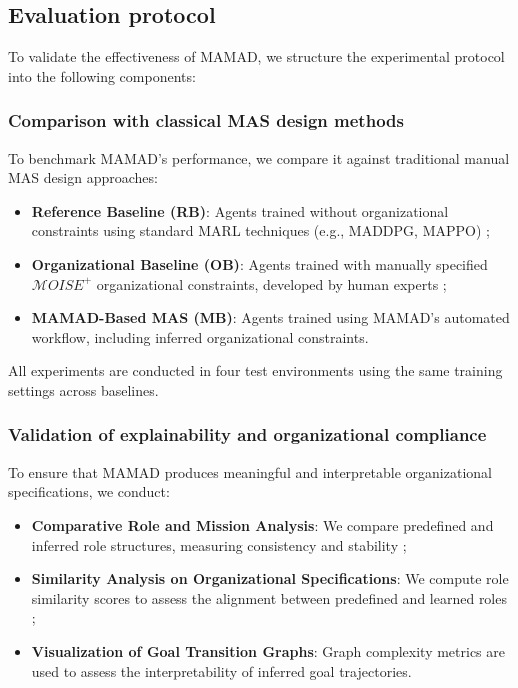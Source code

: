 \documentclass[pdflatex,sn-mathphys-num]{sn-jnl}%
\theoremstyle{thmstyleone}%
\theoremstyle{thmstyletwo}%
\theoremstyle{thmstylethree}%
\begin{document}
\subsection{Evaluation protocol}

To validate the effectiveness of MAMAD, we structure the experimental protocol into the following components:

\subsubsection{Comparison with classical MAS design methods}
To benchmark MAMAD's performance, we compare it against traditional manual MAS design approaches:
\begin{itemize}
    \item \textbf{Reference Baseline (RB)}: Agents trained without organizational constraints using standard MARL techniques (e.g., MADDPG, MAPPO) ;
    \item \textbf{Organizational Baseline (OB)}: Agents trained with manually specified $\mathcal{M}OISE^+$ organizational constraints, developed by human experts ;
    \item \textbf{MAMAD-Based MAS (MB)}: Agents trained using MAMAD's automated workflow, including inferred organizational constraints.
\end{itemize}

All experiments are conducted in four test environments using the same training settings across baselines.

\subsubsection{Validation of explainability and organizational compliance}
To ensure that MAMAD produces meaningful and interpretable organizational specifications, we conduct:
\begin{itemize}
    \item \textbf{Comparative Role and Mission Analysis}: We compare predefined and inferred role structures, measuring consistency and stability ;
    \item \textbf{Similarity Analysis on Organizational Specifications}: We compute role similarity scores to assess the alignment between predefined and learned roles ;
    \item \textbf{Visualization of Goal Transition Graphs}: Graph complexity metrics are used to assess the interpretability of inferred goal trajectories.
\end{itemize}
\end{document}
